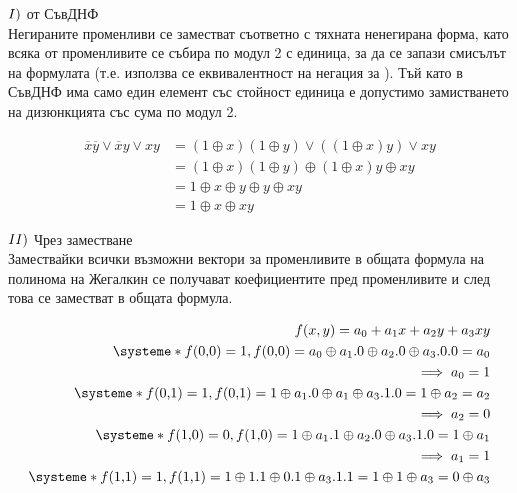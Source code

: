 \begin{alg}
    \(\newline I)\) от СъвДНФ \\
    Негираните променливи се заместват съответно с тяхната ненегирана форма, като всяка от променливите се 
    събира по модул 2 с единица, за да се запази смисълът на формулата (т.е. използва се еквивалентност 
    на негация за ). Тъй като в СъвДНФ има само един 
    елемент със стойност единица е допустимо замистването на дизюнкцията със сума по модул 2.
    \begin{example}
        \begin{align*}
            \overline{x}\overline{y} \vee \overline{x}y \vee xy &= (1 \oplus x)(1 \oplus y) \vee 
            ((1 \oplus x)y) \vee xy \\
            &= (1 \oplus x)(1 \oplus y) \oplus (1 \oplus x) y \oplus xy \\
            &= 1 \oplus x \oplus y \oplus y \oplus xy \\
            &= 1 \oplus x \oplus xy
        \end{align*}
    \end{example}
    \(\newline II)\) Чрез заместване \\
    Замествайки всички възможни вектори за променливите в общата формула на полинома на Жегалкин се 
    получават коефициентите пред променливите и след това се заместват в общата формула.
    \begin{example}
        \begin{align*}
        f(x, y) = a_0 + a_1x + a_2y + a_3xy \\
        \systeme*{
            f(0\text{,} 0) = 1, 
        f(0\text{,} 0) = a_0 \oplus a_1.0 \oplus a_2.0 \oplus a_3.0.0 = a_0} \\
        \implies a_0 = 1 \\
        \systeme*{
            f(0\text{,} 1) = 1, 
        f(0\text{,} 1) = 1 \oplus a_1.0 \oplus a_1 \oplus a_3.1.0 = 1 \oplus a_2 = a_2} \\
        \implies a_2 = 0 \\
        \systeme*{
            f(1\text{,} 0) = 0, 
            f(1\text{,} 0) = 1 \oplus a_1.1 \oplus a_2.0 \oplus a_3.1.0 = 1 \oplus a_1} \\
        \implies a_1 = 1 \\
        \systeme*{
            f(1\text{,} 1) = 1, 
            f(1\text{,} 1) = 1 \oplus 1.1 \oplus 0.1 \oplus a_3.1.1 = 1 \oplus 1 \oplus a_3 = 0 \oplus a_3} \\

\end{align*}
\end{example}
\end{alg}
